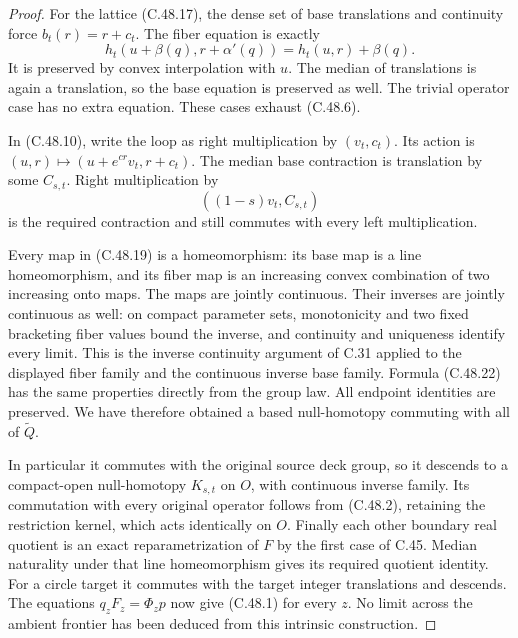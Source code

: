 \begin{proof}
For the lattice (C.48.17), the dense set of base
translations and continuity force $b_t(r)=r+c_t$.
The fiber equation is exactly
\[
 h_t(u+\beta(q),r+\alpha'(q))=h_t(u,r)+\beta(q).
                                                        \tag{C.48.21}
\]
It is preserved by convex interpolation with $u$.
The median of translations is again a translation,
so the base equation is preserved as well.
The trivial operator case has no extra equation.
These cases exhaust (C.48.6).

In (C.48.10), write the loop as right multiplication
by $(v_t,c_t)$. Its action is
$(u,r)\mapsto(u+e^{cr}v_t,r+c_t)$.
The median base contraction is translation by some
$C_{s,t}$. Right multiplication by
\[
                         ((1-s)v_t,C_{s,t})             \tag{C.48.22}
\]
is the required contraction and still commutes with
every left multiplication.

Every map in (C.48.19) is a homeomorphism: its base
map is a line homeomorphism, and its fiber map is
an increasing convex combination of two increasing
onto maps. The maps are jointly continuous. Their
inverses are jointly continuous as well: on compact
parameter sets, monotonicity and two fixed bracketing
fiber values bound the inverse, and continuity and
uniqueness identify every limit. This is the inverse
continuity argument of C.31 applied to the displayed
fiber family and the continuous inverse base family.
Formula (C.48.22) has the same properties directly
from the group law. All endpoint identities are
preserved. We have therefore obtained a based
null-homotopy commuting with all of $\widetilde Q$.

In particular it commutes with the original source
deck group, so it descends to a compact-open
null-homotopy $K_{s,t}$ on $O$, with continuous
inverse family. Its commutation with every original
operator follows from (C.48.2), retaining the
restriction kernel, which acts identically on $O$.
Finally each other boundary real quotient is an
exact reparametrization of $F$ by the first case
of C.45. Median naturality under that line
homeomorphism gives its required quotient identity.
For a circle target it commutes with the target
integer translations and descends. The equations
$q_zF_z=\Phi_zp$ now give (C.48.1) for every $z$.
No limit across the ambient frontier has been
deduced from this intrinsic construction.
\end{proof}
